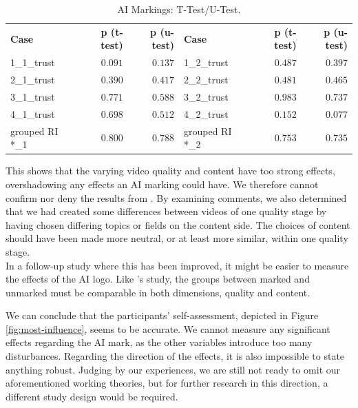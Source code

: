 \documentclass[
  a4paper,  %
  twoside,  %
  bibliography=totoc,
  headsepline,
  cleardoublepage=empty,
  parskip=half,
  draft=false
]{scrbook}
\begin{document}
\begin{table}[h]
	\centering
	\caption{AI Markings: T-Test/U-Test.}
	\label{tab:ttest_logo-trust}
	{
		\begin{tabular}{lrr|lrr}
			\toprule
			\textbf{Case} & \textbf{p (t-test)} & \textbf{p (u-test)} & \textbf{Case} & \textbf{p (t-test)} & \textbf{p (u-test)}  \\
			\cmidrule[0.4pt]{1-6}
			1\_1\_trust & $0.091$ & $0.137$ & 1\_2\_trust & $0.487$ & $0.397$ \\
			2\_1\_trust & $0.390$ & $0.417$ & 2\_2\_trust & $0.481$ & $0.465$ \\
			3\_1\_trust & $0.771$ & $0.588$ & 3\_2\_trust & $0.983$ & $0.737$ \\
			4\_1\_trust & $0.698$ & $0.512$ & 4\_2\_trust & $0.152$ & $0.077$ \\
			grouped RI *\_1 & $0.800$ & $0.788$ & grouped RI *\_2 & $0.753$ & $0.735$\\
			\bottomrule
		\end{tabular}
	}
\end{table}

This shows that the varying video quality and content have too strong effects, overshadowing any effects an AI marking could have. We therefore cannot confirm nor deny the results from . By examining comments, we also determined that we had created some differences between videos of one quality stage by having chosen differing topics or fields on the content side. The choices of content should have been made more neutral, or at least more similar, within one quality stage. \\
In a follow-up study where this has been improved, it might be easier to measure the effects of the AI logo. Like 's study, the groups between marked and unmarked must be comparable in both dimensions, quality and content.

We can conclude that the participants' self-assessment, depicted in Figure \ref{fig:most-influence}, seems to be accurate. We cannot measure any significant effects regarding the AI mark, as the other variables introduce too many disturbances. Regarding the direction of the effects, it is also impossible to state anything robust. Judging by our experiences, we are still not ready to omit our aforementioned working theories, but for further research in this direction, a different study design would be required.
\end{document}
